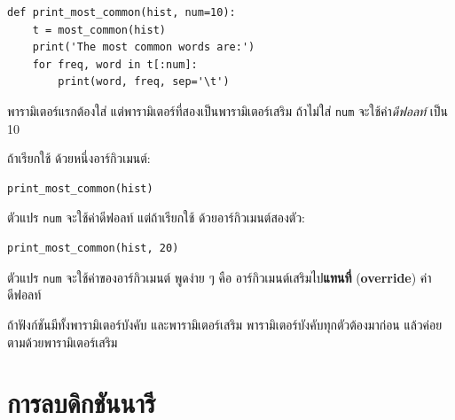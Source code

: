 \begin{verbatim}
def print_most_common(hist, num=10):
    t = most_common(hist)
    print('The most common words are:')
    for freq, word in t[:num]:
        print(word, freq, sep='\t')
\end{verbatim}


พารามิเตอร์แรกต้องใส่ 
แต่พารามิเตอร์ที่สองเป็นพารามิเตอร์เสริม 
ถ้าไม่ใส่ \texttt{num} จะใช้ค่า\textit{ดีฟอลท์} เป็น 10 

ถ้าเรียกใช้ ด้วยหนึ่งอาร์กิวเมนต์:

\begin{verbatim}
print_most_common(hist)
\end{verbatim}

ตัวแปร \texttt{num} จะใช้ค่าดีฟอลท์
แต่ถ้าเรียกใช้ ด้วยอาร์กิวเมนต์สองตัว:

\begin{verbatim}
print_most_common(hist, 20)
\end{verbatim}


ตัวแปร \texttt{num} จะใช้ค่าของอาร์กิวเมนต์
พูดง่าย ๆ คือ อาร์กิวเมนต์เสริมไป\textbf{แทนที่} (\textbf{override}) ค่าดีฟอลท์


ถ้าฟังก์ชันมีทั้งพารามิเตอร์บังคับ และพารามิเตอร์เสริม
พารามิเตอร์บังคับทุกตัวต้องมาก่อน แล้วค่อยตามด้วยพารามิเตอร์เสริม

\section{การลบดิกชันนารี}
\label{dictsub}


